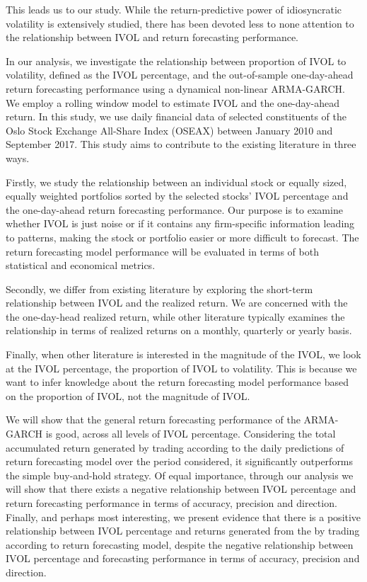 This leads us to our study. While the return-predictive power of idiosyncratic volatility is extensively studied, there has been devoted less to none attention to the relationship between IVOL and return forecasting performance. 

In our analysis, we investigate the relationship between proportion of IVOL to volatility, defined as the IVOL percentage, and the out-of-sample one-day-ahead return forecasting performance using a dynamical non-linear ARMA-GARCH. We employ a rolling window model to estimate IVOL and the one-day-ahead return. In this study, we use daily financial data of selected constituents of the Oslo Stock Exchange All-Share Index (OSEAX) between January 2010 and September 2017. This study aims to contribute to the existing literature in three ways. 

Firstly, we study the relationship between an individual stock or equally sized, equally weighted portfolios sorted by the selected stocks' IVOL percentage and the one-day-ahead return forecasting performance. Our purpose is to examine whether IVOL is just noise or if it contains any firm-specific information leading to patterns, making the stock or portfolio easier or more difficult to forecast. The return forecasting model performance will be evaluated in terms of both statistical and economical metrics.

Secondly, we differ from existing literature by exploring the short-term relationship between IVOL and the realized return. We are concerned with the the one-day-head realized return, while other literature typically examines the relationship in terms of realized returns on a monthly, quarterly or yearly basis.

Finally, when other literature is interested in the magnitude of the IVOL, we look at the IVOL percentage, the proportion of IVOL to volatility. This is because we want to infer knowledge about the return forecasting model performance based on the proportion of IVOL, not the magnitude of IVOL.

We will show that the general return forecasting performance of the ARMA-GARCH is good, across all levels of IVOL percentage. Considering the total accumulated return generated by trading according to the daily predictions of return forecasting model over the period considered, it significantly outperforms the simple buy-and-hold strategy. Of equal importance, through our analysis we will show that there exists a negative relationship between IVOL percentage and return forecasting performance in terms of accuracy, precision and direction. Finally, and perhaps most interesting, we present evidence that there is a positive relationship between IVOL percentage and returns generated from the by trading according to return forecasting model, despite the negative relationship between IVOL percentage and forecasting performance in terms of accuracy, precision and direction. 

